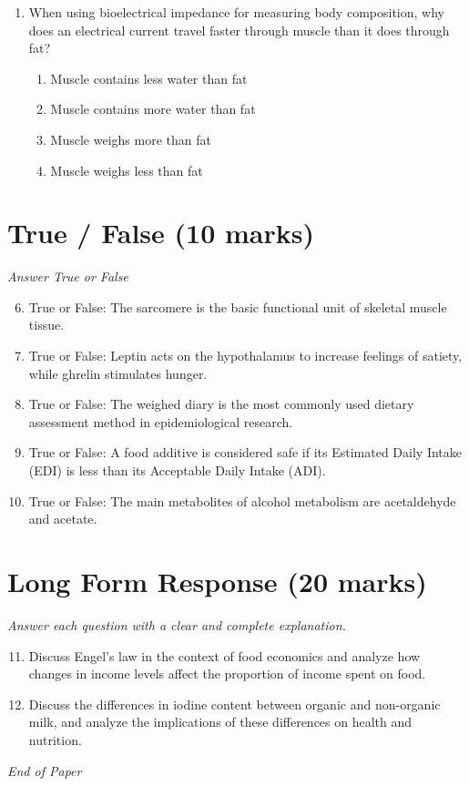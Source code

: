\documentclass[12pt]{article}
\begin{document}
\begin{enumerate}[label=\arabic*.]
\begin{enumerate}[label=(\alph*)]
\end{enumerate}
\item When using bioelectrical impedance for measuring body composition, why does an electrical current travel faster through muscle than it does through fat?
\begin{enumerate}[label=(\alph*)]
    \item Muscle contains less water than fat
    \item Muscle contains more water than fat
    \item Muscle weighs more than fat
    \item Muscle weighs less than fat
\end{enumerate}
\end{enumerate}

\section*{True / False (10 marks)}
\textit{Answer True or False}
\begin{enumerate}[label=\arabic*.]
\setcounter{enumi}{5}
\item True or False: The sarcomere is the basic functional unit of skeletal muscle tissue.
\item True or False: Leptin acts on the hypothalamus to increase feelings of satiety, while ghrelin stimulates hunger.
\item True or False: The weighed diary is the most commonly used dietary assessment method in epidemiological research.
\item True or False: A food additive is considered safe if its Estimated Daily Intake (EDI) is less than its Acceptable Daily Intake (ADI).
\item True or False: The main metabolites of alcohol metabolism are acetaldehyde and acetate.
\end{enumerate}

\section*{Long Form Response (20 marks)}
\textit{Answer each question with a clear and complete explanation.}
\begin{enumerate}[label=\arabic*.]
\setcounter{enumi}{10}
\item Discuss Engel's law in the context of food economics and analyze how changes in income levels affect the proportion of income spent on food.
\item Discuss the differences in iodine content between organic and non-organic milk, and analyze the implications of these differences on health and nutrition.
\end{enumerate}

\vfill
\noindent\textit{End of Paper}
\end{document}
